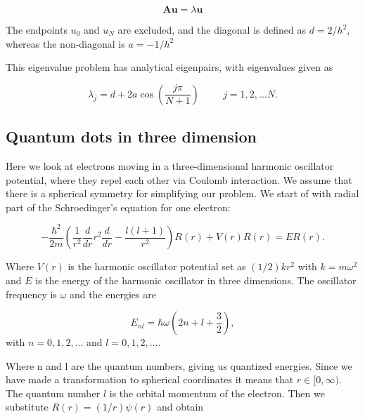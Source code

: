 \documentclass[twoside,onecolumn]{article}
\begin{document}
\begin{equation}
\mathbf{Au} = \lambda \mathbf{u}
\label{eq:matrix} 
\end{equation}

\bigskip

The endpoints $u_0$ and $u_N$ are excluded, and the diagonal is defined as $d=2/h^2$, whereas the non-diagonal is $a =-1/h^2$

\bigskip

This eigenvalue problem has analytical eigenpairs, with eigenvalues given as 

\begin{equation}
\lambda_j = d+2a\cos{(\frac{j\pi}{N+1})} \hspace{1cm} j=1,2,\dots N.
\end{equation}


\subsection{Quantum dots in three dimension}


Here we look at electrons moving in a three-dimensional harmonic oscillator potential, where they repel each other via Coulomb interaction. We assume that there is a spherical symmetry for simplifying our problem. We start of with radial part of the Schroedinger's equation for one electron: 

\bigskip

\begin{equation*}
  -\frac{\hbar^2}{2 m} \left ( \frac{1}{r^2} \frac{d}{dr} r^2
  \frac{d}{dr} - \frac{l (l + 1)}{r^2} \right )R(r) 
     + V(r) R(r) = E R(r).
\end{equation*}

\bigskip


Where $V(r)$ is the harmonic oscillator potential set as $(1/2)kr^2$ with
$k=m\omega^2$ and $E$ is the energy of the harmonic oscillator in three dimensions.
The oscillator frequency is $\omega$ and the energies are

\bigskip

\begin{equation*}
E_{nl}=  \hbar \omega \left(2n+l+\frac{3}{2}\right),
\end{equation*}
with $n=0,1,2,\dots$ and $l=0,1,2,\dots$.

\bigskip

Where n and l are the quantum numbers, giving us quantized energies. Since we have made a transformation to spherical coordinates it means that 
$r\in [0,\infty)$.  
The quantum number
$l$ is the orbital momentum of the electron.  
% 
Then we substitute $R(r) = (1/r) \psi(r)$ and obtain
% 
\bigskip
\end{document}
